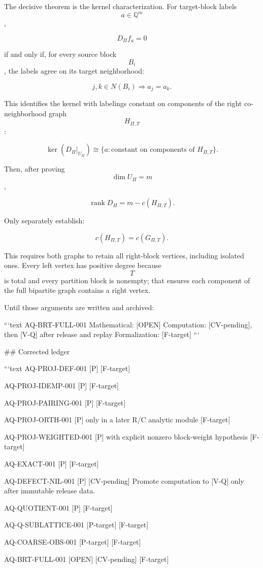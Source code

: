 The decisive theorem is the kernel characterization. For target-block labels $$a\in\mathbb Q^m$$,

$$
D_\Pi f_a=0
$$

if and only if, for every source block $$B_i$$, the labels agree on its target neighborhood:

$$
j,k\in N(B_i)
\Longrightarrow
a_j=a_k.
$$

This identifies the kernel with labelings constant on components of the right co-neighborhood graph $$H_{\Pi,T}$$:

$$
\ker(D_\Pi|_{U_\Pi})
\cong
\{a:\text{constant on components of }H_{\Pi,T}\}.
$$

Then, after proving $$\dim U_\Pi=m$$,

$$
\operatorname{rank}D_\Pi
=
m-c(H_{\Pi,T}).
$$

Only separately establish:

$$
c(H_{\Pi,T})=c(G_{\Pi,T}).
$$

This requires both graphs to retain all right-block vertices, including isolated ones. Every left vertex has positive degree because $$T$$ is total and every partition block is nonempty; that ensures each component of the full bipartite graph contains a right vertex.

Until those arguments are written and archived:

```text
AQ-BRT-FULL-001
Mathematical: [OPEN]
Computation: [CV-pending], then [V-Q] after release and replay
Formalization: [F-target]
```

## Corrected ledger

```text
AQ-PROJ-DEF-001
[P] [F-target]

AQ-PROJ-IDEMP-001
[P] [F-target]

AQ-PROJ-PAIRING-001
[P] [F-target]

AQ-PROJ-ORTH-001
[P] only in a later R/C analytic module
[F-target]

AQ-PROJ-WEIGHTED-001
[P] with explicit nonzero block-weight hypothesis
[F-target]

AQ-EXACT-001
[P] [F-target]

AQ-DEFECT-NIL-001
[P] [CV-pending]
Promote computation to [V-Q] only after immutable release data.

AQ-QUOTIENT-001
[P] [F-target]

AQ-Q-SUBLATTICE-001
[P-target] [F-target]

AQ-COARSE-OBS-001
[P-target] [F-target]

AQ-BRT-FULL-001
[OPEN] [CV-pending] [F-target]

